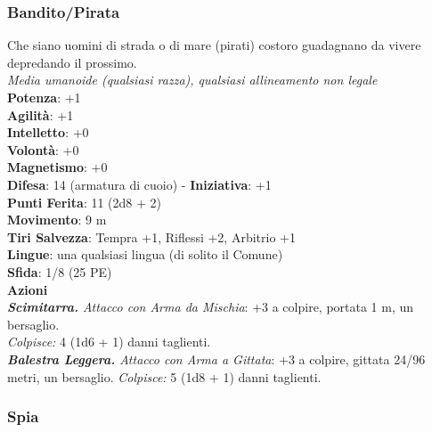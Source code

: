 \begin{multicols}{2}
\subsubsection{Bandito/Pirata}
Che siano uomini di strada o di mare (pirati) costoro guadagnano da vivere depredando il prossimo.\\
\emph{Media umanoide (qualsiasi razza), qualsiasi allineamento non legale}\\
\textbf{Potenza}: +1\\
\textbf{Agilità}: +1\\
\textbf{Intelletto}: +0\\
\textbf{Volontà}: +0\\
\textbf{Magnetismo}: +0\\
\textbf{Difesa}: 14 (armatura di cuoio) - \textbf{Iniziativa}: +1\\
\textbf{Punti Ferita}: 11 (2d8 + 2)\\
\textbf{Movimento}: 9 m\\
\textbf{Tiri Salvezza}: Tempra +1, Riflessi +2, Arbitrio +1 \\
\textbf{Lingue}: una qualsiasi lingua (di solito il Comune)\\
\textbf{Sfida}: 1/8 (25 PE)\smallskip\\
\smallskip\textbf{Azioni}\\
\emph{\textbf{Scimitarra.} Attacco con Arma da Mischia}: +3 a colpire, portata 1 m, un bersaglio.\\
\emph{Colpisce:} 4 (1d6 + 1) danni taglienti.\\
\emph{\textbf{Balestra Leggera.} Attacco con Arma a Gittata}: +3 a colpire, gittata 24/96 metri, un bersaglio. \emph{Colpisce:} 5 (1d8 + 1) danni taglienti.\\

\subsubsection{Spia}


\end{multicols}
